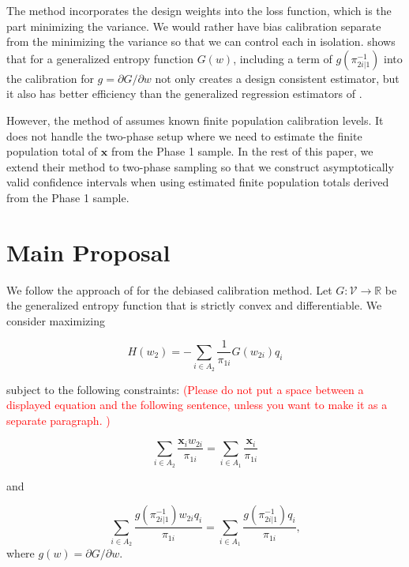 \documentclass[12pt]{article}
\newcommand{\R}{\mathbb{R}}
\renewcommand{\bf}[1]{\mathbf{#1}}
\begin{document}
The \cite{deville1992calibration} method incorporates the design weights into
the loss function, which is the part minimizing the variance. We would rather
have bias calibration separate from the minimizing the variance so that
we can control each in isolation. 
\cite{kwon2024debiased} shows that for a generalized entropy
function $G(w)$, including a term of $g(\pi_{2i|1}^{-1})$ into the calibration
for $g = \partial G / \partial w$ not only creates a design consistent
estimator, but it also has better efficiency than the generalized regression
estimators of \cite{deville1992calibration}.

However, the method of \cite{kwon2024debiased} assumes known finite population 
calibration levels. It does not handle the
two-phase setup where we need to estimate the finite population total of $\bf x$
from the Phase 1 sample. In the rest of this paper, we extend their method to 
two-phase sampling so that we construct asymptotically valid confidence
intervals when using estimated finite population totals derived from the Phase 1
sample.

\section{Main Proposal}

We follow the approach of \cite{kwon2024debiased} for the debiased calibration
method.  Let $G: \mathcal{V} \to \R$ be the generalized entropy function that is
strictly convex and differentiable. We consider maximizing 

\begin{equation}\label{eq:primalloss}
  H(w_2) = - \sum_{i \in A_2} \frac{1}{\pi_{1i}} G(w_{2i}) q_i
\end{equation}

subject to the following constraints:
\textcolor{red}{(Please do not put a space between a displayed equation and the following sentence, unless you want to make it as a separate paragraph. ) }

\begin{equation}\label{eq:calconst1}
  \sum_{i \in A_2} \frac{\bf x_i w_{2i}}{\pi_{1i}} = 
\sum_{i \in A_1} \frac{\bf x_i}{\pi_{1i}}
\end{equation}

and 

\begin{equation}\label{eq:calconst2}
  \sum_{i \in A_2} \frac{g(\pi_{2i|1}^{-1})w_{2i}q_i}{\pi_{1i}} = 
  \sum_{i \in A_1} \frac{g(\pi_{2i|1}^{-1})q_i}{\pi_{1i}}, 
\end{equation}
where $g(w) = \partial G / \partial w$. 
\end{document}
